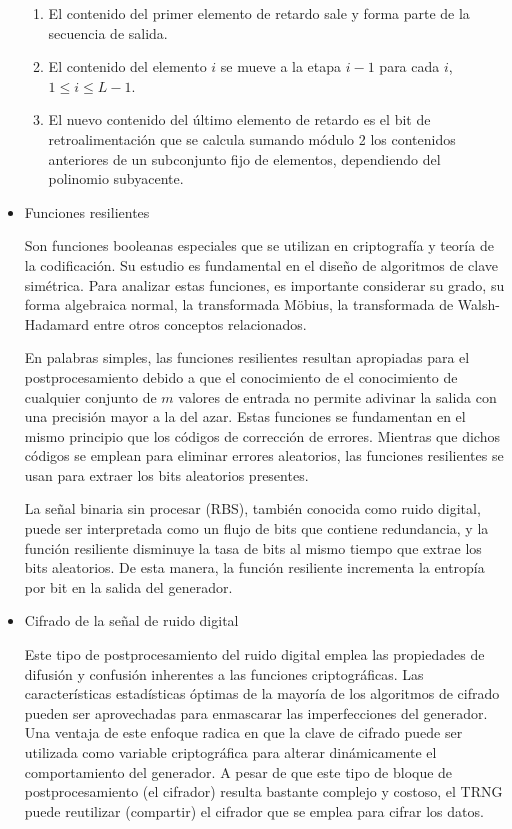 \begin{itemize}
                \begin{enumerate}[noitemsep, label=(\roman*)]
                     \item El contenido del primer elemento de retardo sale y forma parte de la secuencia de salida.
                     \item El contenido del elemento $i$ se mueve a la etapa $i - 1$ para cada $i$, $1 \leq i \leq L - 1$.
                     \item El nuevo contenido del último elemento de retardo es el bit de retroalimentación que se calcula sumando módulo 2 los contenidos anteriores de un subconjunto fijo de elementos, dependiendo del polinomio subyacente.
                 \end{enumerate}	
                
                \item Funciones resilientes
                
                    Son funciones booleanas especiales que se utilizan en criptografía y teoría de la codificación. Su estudio es fundamental en el diseño de algoritmos de clave simétrica. Para analizar estas funciones, es importante considerar su grado, su forma algebraica normal, la transformada Möbius, la transformada de Walsh-Hadamard entre otros conceptos relacionados.

                    En palabras simples, las funciones resilientes resultan apropiadas para el postprocesamiento debido a que el conocimiento de el conocimiento de cualquier conjunto de $m$ valores de entrada no permite adivinar la salida con una precisión mayor a la del azar. Estas funciones se fundamentan en el mismo principio que los códigos de corrección de errores. Mientras que dichos códigos se emplean para eliminar errores aleatorios, las funciones resilientes se usan para extraer los bits aleatorios presentes.

                    La señal binaria sin procesar (RBS), también conocida como ruido digital, puede ser interpretada como un flujo de bits que contiene redundancia, y la función resiliente disminuye la tasa de bits al mismo tiempo que extrae los bits aleatorios. De esta manera, la función resiliente incrementa la entropía por bit en la salida del generador. 

                \item Cifrado de la señal de ruido digital
                
                    Este tipo de postprocesamiento del ruido digital emplea las propiedades de difusión y confusión inherentes a las funciones criptográficas. Las características estadísticas óptimas de la mayoría de los algoritmos de cifrado pueden ser aprovechadas para enmascarar las imperfecciones del generador. Una ventaja de este enfoque radica en que la clave de cifrado puede ser utilizada como variable criptográfica para alterar dinámicamente el comportamiento del generador. A pesar de que este tipo de bloque de postprocesamiento (el cifrador) resulta bastante complejo y costoso, el TRNG puede reutilizar (compartir) el cifrador que se emplea para cifrar los datos.
                

\end{itemize}
